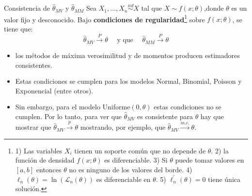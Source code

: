 \documentclass{beamer}
\theoremstyle{definition}
\newcommand{\cp}{\overset{P}{\rightarrow}}
\begin{document}
\begin{frame}{\color{rosee}Consistencia de $\widehat{\theta}_{MV}$ y $\widehat{\theta}_{MM}$}
\small
    Sea $X_{1},\dots,X_{n}\stackrel{iid}{\sim} X$ tal que $X\sim f(x;\theta)$,donde $\theta$ es un valor fijo y desconocido. Bajo
    \textbf{condiciones de regularidad}\footnote{1) Las variables $X_i$ tienen un soporte común que no depende de $\theta$. 2) la función de densidad $f(x;\theta)$ es diferenciable. 3) Si $\theta$ puede tomar valores en $[a,b]$ entonces $\theta$ no es ninguno de los valores del borde. 4)$\ell_n(\theta)=\ln(\mathcal{L}_n(\theta))$ es diferenciable en $\theta$. 5) $\ell_n^{\prime}(\theta)=0$ tiene única solución.} sobre $f(x;\theta)$, se tiene que:
    \[\widehat{\theta}_{MV} \cp \theta\quad \text{ y que } \quad \widehat{\theta}_{MM} \cp \theta\]

 \medskip 
\begin{itemize}
\item los métodos de máxima verosimilitud y de momentos producen estimadores consistentes.\medskip
   
    \item Estas condiciones se cumplen para los modelos Normal, Binomial, Poisson y Exponencial (entre otros). 
    
    \item Sin embargo, para el modelo Uniforme$(0,\theta)$ estas condiciones no se cumplen. Por lo tanto, para ver que $\widehat{\theta}_{MV}$ es consistente para $\theta$ hay que mostrar que $\widehat{\theta}_{MV}\stackrel{p}{\to}\theta$ mostrando, por ejemplo, que $\widehat{\theta}_{MV}\stackrel{m.c.}{\to}\theta$.
\end{itemize}  
\end{frame}
\end{document}
